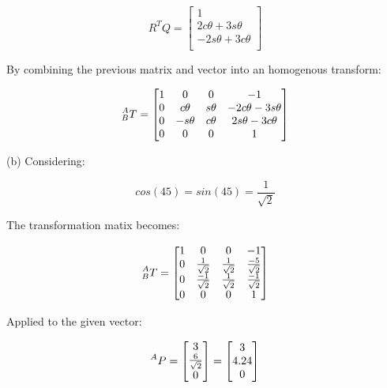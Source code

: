 \documentclass{article}
\begin{document}
\begin{equation}
  R^{T}Q = \begin{bmatrix}
             1                    \\
             2c\theta + 3s\theta  \\
	     -2s\theta + 3c\theta \\
	   \end{bmatrix}
\end{equation}

By combining the previous matrix and vector into an homogenous transform:

\begin{equation}
  \prescript{A}{B}{T} = \begin{bmatrix}
                          1 & 0        & 0       & -1                   \\
			  0 & c\theta  & s\theta & -2c\theta - 3s\theta \\
			  0 & -s\theta & c\theta & 2s\theta - 3 c\theta \\
			  0 & 0        & 0       & 1                    \\
			\end{bmatrix}
\end{equation}

(b) Considering:

\begin{equation}
  cos(45) = sin(45) = \frac{1}{\sqrt{2}}
\end{equation} 

The transformation matix becomes:

\begin{equation}
  \prescript{A}{B}{T} =
    \begin{bmatrix}
       1 & 0                   & 0                  & -1                  \\
       0 & \frac{1}{\sqrt{2}}  & \frac{1}{\sqrt{2}} & \frac{-5}{\sqrt{2}} \\
       0 & \frac{-1}{\sqrt{2}} & \frac{1}{\sqrt{2}} & \frac{-1}{\sqrt{2}} \\
       0 & 0                   & 0                  & 1                   \\
    \end{bmatrix}
\end{equation}

Applied to the given vector:

\begin{equation}
  \prescript{A}{}{P} = \begin{bmatrix}
                         3                  \\
                         \frac{6}{\sqrt{2}} \\
                         0                  \\
                       \end{bmatrix}
		     = \begin{bmatrix}
		         3    \\
			 4.24 \\
			 0    \\
	               \end{bmatrix}
\end{equation}
\end{document}
